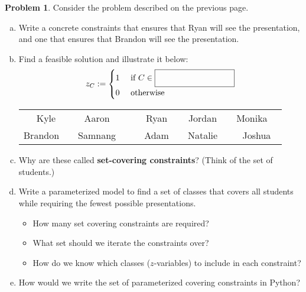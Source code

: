 \documentclass[11pt]{article}
\theoremstyle{definition}
\newtheorem{problem}{Problem}
\newcommand{\answerbox}[3]{%
  \fbox{%
    \begin{minipage}[#1]{#2}
      \hfill\vspace{#3}
    \end{minipage}
  }
}
\newcommand{\wordbox}{\answerbox{c}{1.2in}{.5cm}}
\begin{document}
\begin{problem}  Consider the problem described on the previous page.
\begin{enumerate}[a.]

\item Write a concrete constraints that ensures that Ryan will see the presentation, and one that ensures that Brandon will see the presentation.

\vfill
\item Find a feasible solution and illustrate it below:
\[
z_{C} :=
\begin{cases}
1 & \text{ if } C \in \wordbox \\
0 & \text{ otherwise } 
\end{cases}
\]

\begin{tcolorbox}
\begin{center}
\def\arraystretch{1.5}
\setlength{\tabcolsep}{12pt}
\begin{tabular}{ccccc}
Kyle & Aaron~~ & Ryan & Jordan~~ & Monika~~ \\ Brandon~~ & Samnang~~ & ~~Adam~~ & Natalie~~ & Joshua 
\end{tabular}
\end{center}
\end{tcolorbox}

\bigskip
\item Why are these called {\bf set-covering constraints}? (Think of the set of students.)
\vfill
\item Write a parameterized model to find a set of classes that covers all students while requiring the fewest possible presentations. 
\vfill
\newpage
\begin{itemize}
\item How many set covering constraints are required?  
\vfill
\item What set should we iterate the constraints over?  
\vfill
\item How do we know which classes ($z$-variables) to include in each constraint?
\end{itemize}

\vfill
\item How would we write the set of parameterized covering constraints in Python?
\vfill
\end{enumerate}
\end{problem}


\newpage
\end{document}
